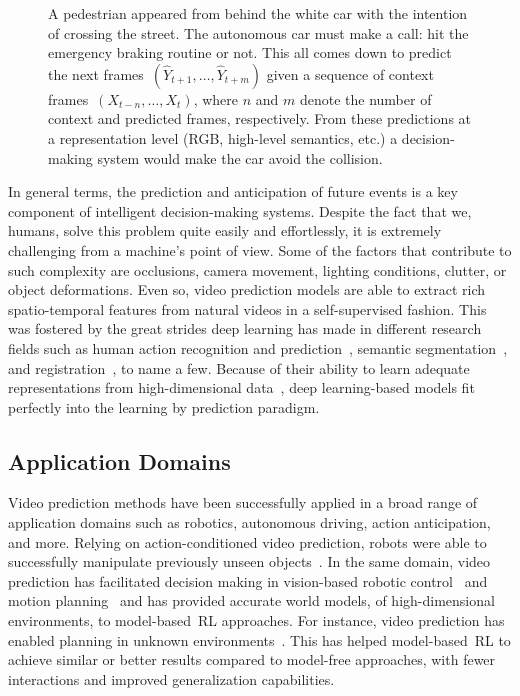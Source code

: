 \begin{figure}[!t]
	\centering
	\resizebox{0.7\textwidth}{!}{
		}
	\caption{A pedestrian appeared from behind the white car with the intention of crossing the street. The autonomous car must make a call: hit the emergency braking routine or not. This all comes down to predict the next frames~$(\hat{Y}_{t+1},\ldots,\hat{Y}_{t+m})$ given a sequence of context frames~$(X_{t-n}, \ldots, X_{t})$, where $n$ and $m$ denote the number of context and predicted frames, respectively. From these predictions at a representation level (RGB, high-level semantics, etc.) a decision-making system would make the car avoid the collision.}
	\label{fig:pedestrian}
\end{figure}

In general terms, the prediction and anticipation of future events is a key component of intelligent decision-making systems. Despite the fact that we, humans, solve this problem quite easily and effortlessly,
it is extremely challenging from a machine's point of view.
Some of the factors that contribute to such complexity are occlusions, camera movement, lighting conditions, clutter, or object deformations. Even so, video prediction models are able to extract rich spatio-temporal features from natural videos in a self-supervised fashion. This was fostered by the great strides deep learning has made in different research fields such as human action recognition and prediction~\cite{Kong2018}, semantic segmentation~\cite{Garcia2018a}, and registration~\cite{Villena2020}, to name a few. Because of their ability to learn adequate representations from high-dimensional data~\cite{LeCun2015}, deep learning-based models fit perfectly into the learning by prediction paradigm.

\subsection{Application Domains}
Video prediction methods have been successfully applied in a broad range of application domains such as robotics, autonomous driving, action anticipation, and more. Relying on action-conditioned video prediction, robots were able to successfully manipulate previously unseen objects~\cite{Finn2016}. In the same domain, video prediction has facilitated decision making in vision-based robotic control~\cite{Ebert2018} and motion planning~\cite{Koppula2016,Xie2019} and has provided accurate world models, of high-dimensional environments, to model-based~\ac{RL} approaches. For instance, video prediction has enabled planning in unknown environments~\cite{Hafner2019, Kaiser2020}. This has helped model-based~\ac{RL} to achieve similar or better results compared to model-free approaches, with fewer interactions and improved generalization capabilities.

